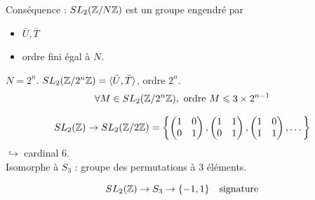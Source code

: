 Conséquence : $SL_2(\mathbb{Z}/N\mathbb{Z})$ est un groupe engendré par 
\begin{itemize}
    \item $\bar U, \bar T$
    \item ordre fini égal à $N$.
\end{itemize}

 $N = 2^n$. $SL_2(\mathbb{Z}/2^n\mathbb{Z}) = \langle \bar U, \bar T \rangle$, ordre $2^n$.
\[ \forall M \in SL_2(\mathbb{Z}/2^n\mathbb{Z}), \text{ ordre } M \leqslant 3 \times 2^{n-1} \]

\[ SL_2(\mathbb{Z}) \to SL_2(\mathbb{Z}/2\mathbb{Z}) = \left\{ \begin{pmatrix} 1 & 0 \\ 0 & 1 \end{pmatrix}, \begin{pmatrix} 1 & 1 \\ 0 & 1 \end{pmatrix}, \begin{pmatrix} 1 & 0 \\ 1 & 1 \end{pmatrix}, \dots \right\} \]
$\hookrightarrow$ cardinal 6. \\
Isomorphe à $S_3$ : groupe des permutations à 3 éléments.

\[ SL_2(\mathbb{Z}) \to S_3 \to \{-1, 1\} \quad \text{signature} \]

